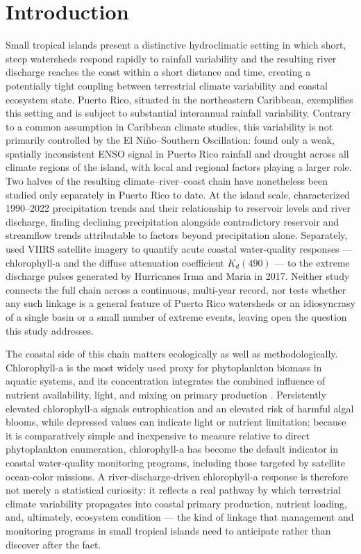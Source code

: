 \documentclass[preprint,12pt]{elsarticle}
\begin{document}
\linenumbers

\section{Introduction}

Small tropical islands present a distinctive hydroclimatic setting in which short, steep watersheds respond rapidly to rainfall variability and the resulting river discharge reaches the coast within a short distance and time, creating a potentially tight coupling between terrestrial climate variability and coastal ecosystem state. Puerto Rico, situated in the northeastern Caribbean, exemplifies this setting and is subject to substantial interannual rainfall variability. Contrary to a common assumption in Caribbean climate studies, this variability is not primarily controlled by the El Ni\~no--Southern Oscillation: \citet{torresvalcarcel2018enso} found only a weak, spatially inconsistent ENSO signal in Puerto Rico rainfall and drought across all climate regions of the island, with local and regional factors playing a larger role. Two halves of the resulting climate--river--coast chain have nonetheless been studied only separately in Puerto Rico to date. At the island scale, \citet{trossitorres2025precipitation} characterized 1990--2022 precipitation trends and their relationship to reservoir levels and river discharge, finding declining precipitation alongside contradictory reservoir and streamflow trends attributable to factors beyond precipitation alone. Separately, \citet{hernandez2020hurricanes} used VIIRS satellite imagery to quantify acute coastal water-quality responses --- chlorophyll-a and the diffuse attenuation coefficient $K_d(490)$ --- to the extreme discharge pulses generated by Hurricanes Irma and Maria in 2017. Neither study connects the full chain across a continuous, multi-year record, nor tests whether any such linkage is a general feature of Puerto Rico watersheds or an idiosyncrasy of a single basin or a small number of extreme events, leaving open the question this study addresses.

The coastal side of this chain matters ecologically as well as methodologically. Chlorophyll-a is the most widely used proxy for phytoplankton biomass in aquatic systems, and its concentration integrates the combined influence of nutrient availability, light, and mixing on primary production \citep{boyer2009phytoplankton}. Persistently elevated chlorophyll-a signals eutrophication and an elevated risk of harmful algal blooms, while depressed values can indicate light or nutrient limitation; because it is comparatively simple and inexpensive to measure relative to direct phytoplankton enumeration, chlorophyll-a has become the default indicator in coastal water-quality monitoring programs, including those targeted by satellite ocean-color missions. A river-discharge-driven chlorophyll-a response is therefore not merely a statistical curiosity: it reflects a real pathway by which terrestrial climate variability propagates into coastal primary production, nutrient loading, and, ultimately, ecosystem condition — the kind of linkage that management and monitoring programs in small tropical islands need to anticipate rather than discover after the fact.
\end{document}
